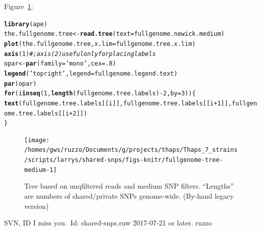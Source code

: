 \documentclass{article}\usepackage[]{graphicx}\usepackage[]{color}
\makeatletter
\newcommand{\hlnum}[1]{\textcolor[rgb]{0.686,0.059,0.569}{#1}}%
\newcommand{\hlstr}[1]{\textcolor[rgb]{0.192,0.494,0.8}{#1}}%
\newcommand{\hlcom}[1]{\textcolor[rgb]{0.678,0.584,0.686}{\textit{#1}}}%
\newcommand{\hlopt}[1]{\textcolor[rgb]{0,0,0}{#1}}%
\newcommand{\hlstd}[1]{\textcolor[rgb]{0.345,0.345,0.345}{#1}}%
\newcommand{\hlkwa}[1]{\textcolor[rgb]{0.161,0.373,0.58}{\textbf{#1}}}%
\newcommand{\hlkwb}[1]{\textcolor[rgb]{0.69,0.353,0.396}{#1}}%
\newcommand{\hlkwc}[1]{\textcolor[rgb]{0.333,0.667,0.333}{#1}}%
\newcommand{\hlkwd}[1]{\textcolor[rgb]{0.737,0.353,0.396}{\textbf{#1}}}%
\newenvironment{kframe}{%
 \def\at@end@of@kframe{}%
 \ifinner\ifhmode%
  \def\at@end@of@kframe{\end{minipage}}%
  \begin{minipage}{\columnwidth}%
 \fi\fi%
 \def\FrameCommand##1{\hskip\@totalleftmargin \hskip-\fboxsep
 \colorbox{shadecolor}{##1}\hskip-\fboxsep
     \hskip-\linewidth \hskip-\@totalleftmargin \hskip\columnwidth}%
 \MakeFramed {\advance\hsize-\width
   \@totalleftmargin\z@ \linewidth\hsize
   \@setminipage}}%
 {\par\unskip\endMakeFramed%
 \at@end@of@kframe}
\newenvironment{knitrout}{}{} %
\makeatother
\begin{document}
Figure~\ref{fig:fullgenome-tree-medium}:

\begin{knitrout}\scriptsize
{}\color{fgcolor}\begin{kframe}
\begin{alltt}
\hlkwd{library}\hlstd{(ape)}
\hlstd{the.fullgenome.tree} \hlkwb{<-} \hlkwd{read.tree}\hlstd{(}\hlkwc{text}\hlstd{=fullgenome.newick.medium)}
\hlkwd{plot}\hlstd{(the.fullgenome.tree,} \hlkwc{x.lim} \hlstd{= fullgenome.tree.x.lim)}
\hlkwd{axis}\hlstd{(}\hlnum{1}\hlstd{)} \hlcom{# ; axis(2) useful only for placing labels}
\hlstd{opar} \hlkwb{<-} \hlkwd{par}\hlstd{(}\hlkwc{family}\hlstd{=}\hlstr{'mono'}\hlstd{,}\hlkwc{cex}\hlstd{=}\hlnum{.8}\hlstd{)}
\hlkwd{legend}\hlstd{(}\hlstr{'topright'}\hlstd{,} \hlkwc{legend}\hlstd{=fullgenome.legend.text)}
\hlkwd{par}\hlstd{(opar)}
\hlkwa{for}\hlstd{(i} \hlkwa{in} \hlkwd{seq}\hlstd{(}\hlnum{1}\hlstd{,}\hlkwd{length}\hlstd{(fullgenome.tree.labels)}\hlopt{-}\hlnum{2}\hlstd{,}\hlkwc{by}\hlstd{=}\hlnum{3}\hlstd{))\{}
  \hlkwd{text}\hlstd{(fullgenome.tree.labels[[i]], fullgenome.tree.labels[[i}\hlopt{+}\hlnum{1}\hlstd{]], fullgenome.tree.labels[[i}\hlopt{+}\hlnum{2}\hlstd{]])}
\hlstd{\}}
\end{alltt}
\end{kframe}\begin{figure}

{\centering \texttt{[image: /homes/gws/ruzzo/Documents/g/projects/thaps/Thaps\_7\_strains/scripts/larrys/shared-snps/figs-knitr/fullgenome-tree-medium-1]} 

}

\caption[Tree based on unqfiltered reads and medium SNP filters]{Tree based on unqfiltered reads and medium SNP filters.  ``Lengths'' are numbers of shared/private SNPs genome-wide. (By-hand legacy version)}\label{fig:fullgenome-tree-medium}
\end{figure}


\end{knitrout}

\FloatBarrier

\mbox{}\vfill\footnotesize\flushright SVN, ID I miss you.\ $ $Id: shared-snps.rnw  2017-07-21 or later. ruzzo $ $
\end{document}
